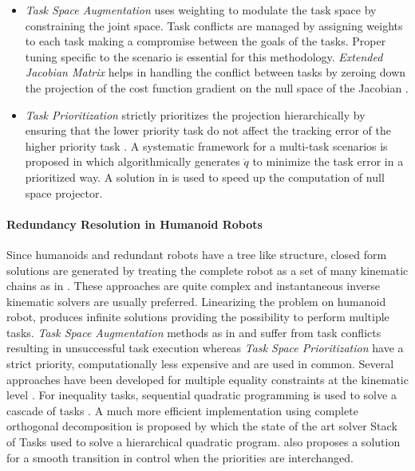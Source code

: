  \begin{itemize}
     \item \textit{Task Space Augmentation} uses weighting to modulate the task space by constraining the joint space\cite{sciavicco1987solving}. Task conflicts are managed by assigning weights to each task making a compromise between the goals of the tasks.  Proper tuning specific to the scenario is essential for this methodology. \textit{Extended Jacobian Matrix} helps in handling the conflict between tasks by zeroing down the projection of the cost function gradient on the null space of the Jacobian \cite{baillieul1985kinematic}.

     \item \textit{Task Prioritization} strictly prioritizes the projection hierarchically by ensuring that the lower priority task do not affect the tracking error of the higher priority task \cite{nakamura1987task}. A systematic framework for a multi-task scenarios is proposed in \cite{siciliano1991general} which algorithmically generates $\dot{q}$ to minimize the task error in a prioritized way. A solution in \cite{Baerlocher1998} is used to speed up the computation of null space projector. 
     
 \end{itemize}

\paragraph{Redundancy Resolution in Humanoid Robots}
Since humanoids and redundant robots have a tree like structure, closed form solutions are generated by treating the complete robot as a set of many kinematic chains as in \cite{ali2010closed,nunez2012explicit}. These approaches are quite complex and instantaneous inverse kinematic solvers are usually preferred. Linearizing the problem on humanoid robot, produces infinite solutions providing the possibility to perform multiple tasks. \textit{Task Space Augmentation} methods as in \cite{tevatia2000inverse} and \cite{salini2009lqp} suffer from task conflicts resulting in unsuccessful task execution whereas \textit{Task Space Prioritization} have a strict priority, computationally less expensive and are used in common. Several approaches have been developed for multiple equality constraints at the kinematic level \cite{yoshida2006task,mansard2007task,gienger2005task}. For inequality tasks, sequential quadratic programming is used to solve a cascade of tasks \cite{kanoun2009prioritizing}. A much more efficient implementation using complete orthogonal decomposition
is proposed by \cite{Escande2014} which the state of the art solver Stack of Tasks used to solve a hierarchical quadratic program. \cite{jarquin2013real} also proposes a solution for a smooth transition in control when the priorities are interchanged.  



